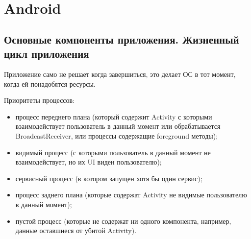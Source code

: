 



\renewcommand\labelitemi{$\bullet$}




\section{Android}

\subsection{Основные компоненты приложения. Жизненный цикл приложения}

Приложение само не решает когда завершиться, это делает ОС в тот момент, когда ей понадобятся ресурсы.

Приоритеты процессов:
\begin{itemize}
	\item процесс переднего плана (который содержит Activity с которыми взаимодействует пользователь в данный момент или обрабатывается \\ BroadcastReceiver, или процессы содержащие foreground методы);
	\item видимый процесс (с которыми пользователь в данный момент не взаимодействует, но их UI виден пользователю);
	\item сервисный процесс (в котором запущен хотя бы один сервис);
	\item процесс заднего плана (которые содержат Activity не видимые пользователю в данный момент);
	\item пустой процесс (которые не содержат ни одного компонента, например, данные оставшиеся от убитой Activity).
\end{itemize}

